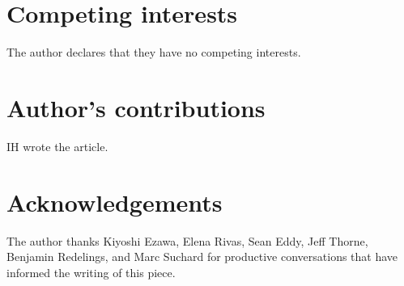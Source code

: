 \documentclass{bmcart}
\begin{document}
\begin{backmatter}

\section*{Competing interests}
  The author declares that they have no competing interests.

\section*{Author's contributions}
    IH wrote the article.

\section*{Acknowledgements}
  The author thanks Kiyoshi Ezawa, Elena Rivas, Sean Eddy, Jeff Thorne,
  Benjamin Redelings, and Marc Suchard
  for productive conversations that have informed the writing of this piece.




\end{backmatter}
\end{document}
